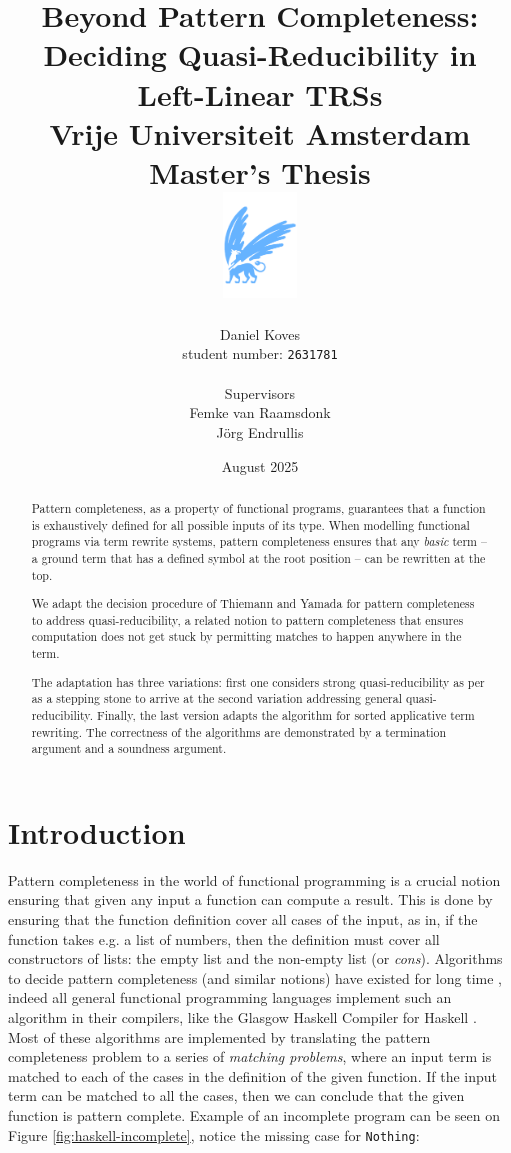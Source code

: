 \documentclass{report}
\title{Beyond Pattern Completeness:\\Deciding Quasi-Reducibility in Left-Linear TRSs\\
\vspace{1cm}
{\large Vrije Universiteit Amsterdam} \\ 
{\large Master's Thesis} \\
\vspace{1.3cm}
{\includegraphics[height=28mm]{vu-griffioen.pdf}}
}
\author{Daniel Koves\\
\small{student number: \texttt{2631781}}\\
\vspace*{0.5cm}\\    
  \normalsize{Supervisors} \\
  Femke van Raamsdonk \\
  Jörg Endrullis
}
\date{August 2025}
\theoremstyle{definition}
\begin{document}
\maketitle

\begin{abstract}
    Pattern completeness, as a property of functional programs, guarantees that a function is exhaustively defined for all possible inputs of its type. When modelling functional programs via term rewrite systems, pattern completeness ensures that any \textit{basic} term – a ground term that has a defined symbol at the root position – can be rewritten at the top.

    We adapt the decision procedure of Thiemann and Yamada \cite{thiemann} for pattern completeness to address quasi-reducibility, a related notion to pattern completeness that ensures computation does not get stuck by permitting matches to happen anywhere in the term. 

    The adaptation has three variations: first one considers strong quasi-reducibility as per \cite{aoto} as a stepping stone to arrive at the second variation addressing general quasi-reducibility. Finally, the last version adapts the algorithm for sorted applicative term rewriting. The correctness of the algorithms are demonstrated by a termination argument and a soundness argument.
\end{abstract}

\tableofcontents

\chapter{Introduction}\label{chapter:intro}
Pattern completeness in the world of functional programming is a crucial notion ensuring that given any input a function can compute a result. This is done by ensuring that the function definition cover all cases of the input, as in, if the function takes e.g. a list of numbers, then the definition must cover all constructors of lists: the empty list and the non-empty list (or \textit{cons}). Algorithms to decide pattern completeness (and similar notions) have existed for long time \cite{thiel, kapur, lazrek}, indeed all general functional programming languages implement such an algorithm in their compilers, like the Glasgow Haskell Compiler for Haskell \cite{ghc}. Most of these algorithms are implemented by translating the pattern completeness problem to a series of \textit{matching problems}, where an input term is matched to each of the cases in the definition of the given function. If the input term can be matched to all the cases, then we can conclude that the given function is pattern complete. Example of an incomplete program can be seen on Figure \ref{fig:haskell-incomplete}, notice the missing case for \texttt{Nothing}:
\end{document}
